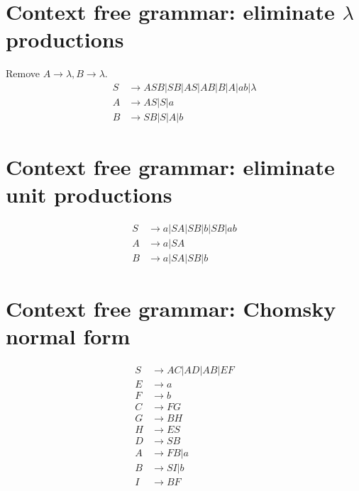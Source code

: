 \documentclass{article}
\begin{document}
\section{Context free grammar: eliminate $\lambda$ productions}
Remove $A \to \lambda, B \to \lambda$.
\begin{align*}
S &\to ASB | SB | AS | AB | B | A | ab | \lambda \\
A &\to AS | S | a \\
B &\to SB | S | A | b
\end{align*}
\section{Context free grammar: eliminate unit productions}
\begin{align*}
S &\to a | SA | SB | b | SB | ab \\
A &\to a | SA \\
B &\to a | SA | SB | b
\end{align*}
\section{Context free grammar: Chomsky normal form}
\begin{align*}
S &\to AC | AD | AB | EF \\
E &\to a\\
F &\to b\\
C &\to FG\\
G &\to BH\\
H &\to ES\\
D &\to SB\\
A &\to FB | a\\
B &\to SI | b\\
I &\to BF
\end{align*}
\end{document}
